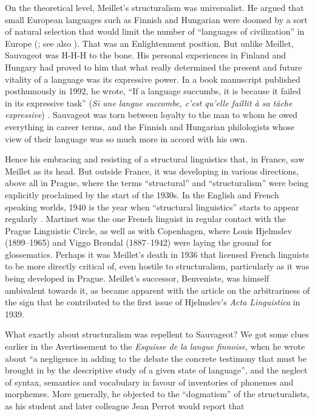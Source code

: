 \documentclass[output=paper]{langscibook}
\begin{document}
On the theoretical level, Meillet's structuralism was universalist. He argued that small European languages such as Finnish and Hungarian were doomed by a sort of natural selection that would limit the number of ``languages of civilization'' in Europe (\citealt[279]{Meillet1918}; see also \citealt[209--210]{Sauvageot2013}). That was an Enlightenment position. But unlike Meillet, Sauvageot was H-H-H to the bone. His personal experiences in Finland and Hungary had proved to him that what really determined the present and future vitality of a language was its expressive power. In a book manuscript published posthumously in 1992, he wrote, ``If a language succumbs, it is because it failed in its expressive task'' (\emph{Si une langue succombe, c'est qu'elle faillit à sa tâche expressive}) \citep[160]{Sauvageot1992}. Sauvageot was torn between loyalty to the man to whom he owed everything in career terms, and the Finnish and Hungarian philologists whose view of their language was so much more in accord with his own.

Hence his embracing and resisting of a structural linguistics that, in France, saw Meillet as its head. But outside France, it was developing in various directions, above all in Prague, where the terms ``structural'' and ``structuralism'' were being explicitly proclaimed by the start of the 1930s. In the English and French speaking worlds, 1940 is the year when ``structural linguistics'' starts to appear regularly \citep[see][]{Joseph2015}. Martinet was the one French linguist in regular contact with the Prague Linguistic Circle, as well as with Copenhagen, where Louis Hjelmslev (1899--1965) and Viggo Brøndal (1887--1942) were laying the ground for glossematics. Perhaps it was Meillet's death in 1936 that licensed French linguists to be more directly critical of, even hostile to structuralism, particularly as it was being developed in Prague. Meillet's successor, Benveniste, was himself ambivalent towards it, as became apparent with the article on the arbitrariness of the sign that he contributed to the first issue of Hjelmslev's \emph{Acta Linguistica} in 1939.

What exactly about structuralism was repellent to Sauvageot? We got some clues earlier in the Avertissement to the \emph{Esquisse de la langue finnoise}, when he wrote about ``a negligence in adding to the debate the concrete testimony that must be brought in by the descriptive study of a given state of language'', and the neglect of syntax, semantics and vocabulary in favour of inventories of phonemes and morphemes. More generally, he objected to the ``dogmatism'' of the structuralists, as his student and later colleague Jean Perrot would report that
\end{document}
